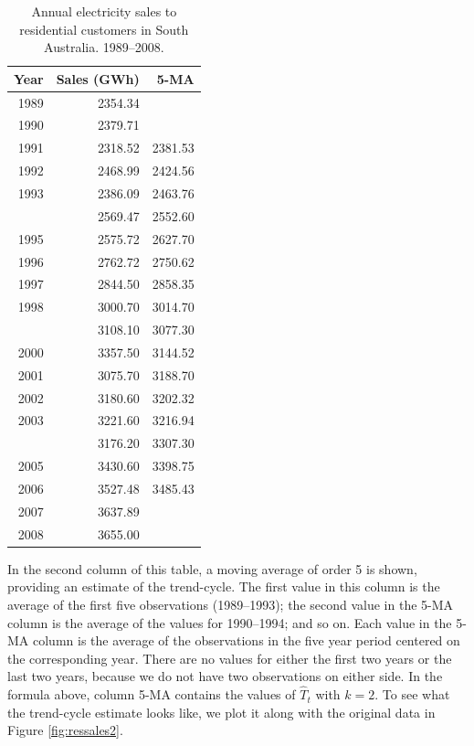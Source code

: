 \documentclass[]{book}
\begin{document}
\begin{table}[t]

\caption{\label{tab:elecsales}Annual electricity sales to residential customers in South Australia. 1989--2008.}
\centering
\begin{tabular}{rrr}
\toprule
Year & Sales (GWh) & 5-MA\\
\midrule
1989 & 2354.34 &   \\
1990 & 2379.71 &   \\
1991 & 2318.52 & 2381.53\\
1992 & 2468.99 & 2424.56\\
1993 & 2386.09 & 2463.76\\
\addlinespace
1994 & 2569.47 & 2552.60\\
1995 & 2575.72 & 2627.70\\
1996 & 2762.72 & 2750.62\\
1997 & 2844.50 & 2858.35\\
1998 & 3000.70 & 3014.70\\
\addlinespace
1999 & 3108.10 & 3077.30\\
2000 & 3357.50 & 3144.52\\
2001 & 3075.70 & 3188.70\\
2002 & 3180.60 & 3202.32\\
2003 & 3221.60 & 3216.94\\
\addlinespace
2004 & 3176.20 & 3307.30\\
2005 & 3430.60 & 3398.75\\
2006 & 3527.48 & 3485.43\\
2007 & 3637.89 &   \\
2008 & 3655.00 &   \\
\bottomrule
\end{tabular}
\end{table}

In the second column of this table, a moving average of order 5 is shown, providing an estimate of the trend-cycle. The first value in this column is the average of the first five observations (1989--1993); the second value in the 5-MA column is the average of the values for 1990--1994; and so on. Each value in the 5-MA column is the average of the observations in the five year period centered on the corresponding year. There are no values for either the first two years or the last two years, because we do not have two observations on either side. In the formula above, column
5-MA contains the values of \(\hat{T}_{t}\) with \(k=2\). To see what the trend-cycle estimate looks like, we plot it along with the original data in Figure \ref{fig:ressales2}.
\end{document}
